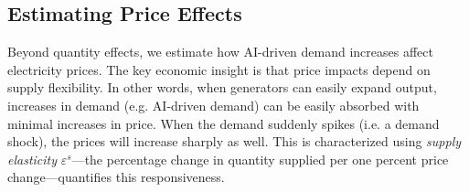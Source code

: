 \documentclass[a4paper,fleqn,longmktitle]{cas-sc}
\newcommand{\nb}[1]{\textcolor{blue}{NB[#1]}}
\theoremstyle{plain}
\theoremstyle{definition}
\begin{document}
\subsection{Estimating Price Effects}\label{PriceEffects}
Beyond quantity effects, we estimate how AI-driven demand increases affect electricity prices. The key economic insight is that price impacts depend on supply flexibility. In other words, when generators can easily expand output, increases in demand (e.g. AI-driven demand) can be easily absorbed with minimal increases in price. When the demand suddenly spikes (i.e. a demand shock), the prices will increase sharply as well. This is characterized using \textit{supply elasticity} $\varepsilon^s$—the percentage change in quantity supplied per one percent price change—quantifies this responsiveness.

\end{document}
